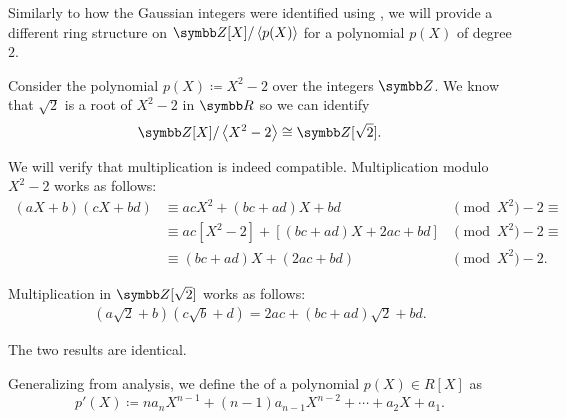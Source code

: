 \begin{example}\label{ex:polynomial_quotient_rings_z2}
  Similarly to how the Gaussian integers were identified using , we will provide a different ring structure on \( \BZ[X] / \Gen{p(X)} \) for a polynomial \( p(X) \) of degree \( 2 \).

  Consider the polynomial \( p(X) \coloneqq X^2 - 2 \) over the integers \( \BZ \). We know that \( \sqrt 2 \) is a root of \( X^2 - 2 \) in \( \BR \) so we can identify
  \begin{equation*}
    \BZ[X] / \Gen{X^2 - 2} \cong \BZ[\sqrt 2].
  \end{equation*}

  We will verify that multiplication is indeed compatible. Multiplication modulo \( X^2 - 2 \) works as follows:
  \begin{align*}
    (aX + b) (cX + bd)
    &\equiv
    acX^2 + (bc + ad)X + bd
    &\pmod X^2 - 2 \equiv \\ &\equiv
    ac[X^2 - 2] + [(bc + ad)X + 2ac + bd]
    &\pmod X^2 - 2 \equiv \\ &\equiv
    (bc + ad)X + (2ac + bd)
    &\pmod X^2 - 2. \phantom{\equiv}
  \end{align*}

  Multiplication in \( \BZ[\sqrt 2] \) works as follows:
  \begin{align*}
    (a \sqrt 2 + b) (c \sqrt b + d)
    =
    2ac + (bc + ad) \sqrt 2 + bd.
  \end{align*}

  The two results are identical.
\end{example}

\begin{definition}\label{def:algebraic_derivative}
  Generalizing  from analysis, we define the  of a polynomial \( p(X) \in R[X] \) as
  \begin{equation*}
    p'(X) \coloneqq n a_n X^{n-1} + (n-1) a_{n-1} X^{n-2} + \cdots + a_2 X + a_1.
  \end{equation*}
\end{definition}

